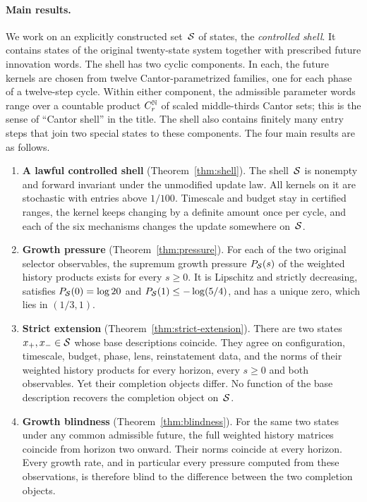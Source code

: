 \paragraph{Main results.}
We work on an explicitly constructed set~$\mathcal{S}$ of states, the \emph{controlled shell}. It contains states of the original twenty-state system together with prescribed future innovation words. The shell has two cyclic components. In each, the future kernels are chosen from twelve Cantor-parametrized families, one for each phase of a twelve-step cycle. Within either component, the admissible parameter words range over a countable product $C_r^{\mathbb{N}}$ of scaled middle-thirds Cantor sets; this is the sense of ``Cantor shell'' in the title. The shell also contains finitely many entry steps that join two special states to these components. The four main results are as follows.

\begin{enumerate}[label=\textbf{\Alph*.}]
  \item \textbf{A lawful controlled shell} (Theorem~\ref{thm:shell}). The shell~$\mathcal{S}$ is nonempty and forward invariant under the unmodified update law. All kernels on it are stochastic with entries above $1/100$. Timescale and budget stay in certified ranges, the kernel keeps changing by a definite amount once per cycle, and each of the six mechanisms changes the update somewhere on~$\mathcal{S}$.
  \item \textbf{Growth pressure} (Theorem~\ref{thm:pressure}). For each of the two original selector observables, the supremum growth pressure $P_{\mathcal{S}}(s)$ of the weighted history products exists for every $s\ge 0$. It is Lipschitz and strictly decreasing, satisfies $P_{\mathcal{S}}(0)=\log 20$ and $P_{\mathcal{S}}(1)\le-\log(5/4)$, and has a unique zero, which lies in $(1/3,1)$.
  \item \textbf{Strict extension} (Theorem~\ref{thm:strict-extension}). There are two states $x_{+},x_{-}\in\mathcal{S}$ whose base descriptions coincide. They agree on configuration, timescale, budget, phase, lens, reinstatement data, and the norms of their weighted history products for every horizon, every $s\ge 0$ and both observables. Yet their completion objects differ. No function of the base description recovers the completion object on~$\mathcal{S}$.
  \item \textbf{Growth blindness} (Theorem~\ref{thm:blindness}). For the same two states under any common admissible future, the full weighted history matrices coincide from horizon two onward. Their norms coincide at every horizon. Every growth rate, and in particular every pressure computed from these observations, is therefore blind to the difference between the two completion objects.
\end{enumerate}

